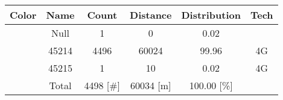 \begin{longtable*}{|c|c|c|c|c|c|}\hline
{}
Color&Name&Count&Distance&Distribution&Tech\\\hline\hline
{} &Null&1&0&0.02&\\\hline
{} &45214&4496&60024&99.96&4G\\\hline
{} &45215&1&10&0.02&4G\\\hline
{} &Total&4498 [\#]&60034 [m]&100.00 [\%]&\\\hline
\end{longtable*}
